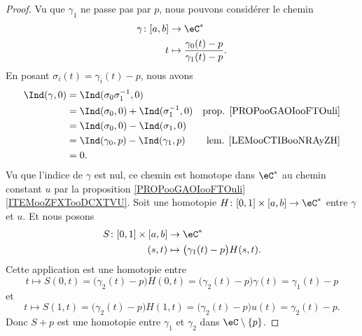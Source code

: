 \begin{proof}
	Vu que \( \gamma_1\) ne passe pas par \( p\), nous pouvons considérer le chemin
	\begin{equation}
		\begin{aligned}
			\gamma\colon \mathopen[ a , b \mathclose] & \to \eC^*                                        \\
			t                                         & \mapsto \frac{ \gamma_0(t)-p }{ \gamma_1(t)-p }.
		\end{aligned}
	\end{equation}
	En posant \( \sigma_i(t)=\gamma_i(t)-p\), nous avons
	\begin{subequations}
		\begin{align}
			\Ind(\gamma,0) & =\Ind(\sigma_0\sigma_1^{-1},0)                                                  \\
			               & =\Ind(\sigma_0,0)+\Ind(\sigma_1^{-1},0) & \text{prop. \ref{PROPooGAOIooFTOuli}} \\
			               & =\Ind(\sigma_0,0)-\Ind(\sigma_1,0)                                              \\
			               & =\Ind(\gamma_0,p)-\Ind(\gamma_1,p)      & \text{lem. \ref{LEMooCTIBooNRAyZH}}   \\
			               & =0.
		\end{align}
	\end{subequations}
	Vu que l'indice de \( \gamma\) est nul, ce chemin est homotope dans \( \eC^*\) au chemin constant \( u\) par la proposition \ref{PROPooGAOIooFTOuli}\ref{ITEMooZFXTooDCXTVU}. Soit une homotopie \( H\colon \mathopen[ 0 , 1 \mathclose]\times \mathopen[ a , b \mathclose]\to \eC^*\) entre \( \gamma\) et \( u\). Et nous posons
	\begin{equation}
		\begin{aligned}
			S\colon \mathopen[ 0 , 1 \mathclose]\times \mathopen[ a , b \mathclose] & \to \eC^*                                 \\
			(s,t)                                                                   & \mapsto \big( \gamma_1(t)-p \big)H(s,t) .
		\end{aligned}
	\end{equation}
	Cette application est une homotopie entre
	\begin{equation}
		t\mapsto S(0,t)=\big( \gamma_2(t)-p \big)H(0,t)=\big( \gamma_2(t)-p \big)\gamma(t)=\gamma_1(t)-p
	\end{equation}
	et
	\begin{equation}
		t\mapsto S(1,t)=\big( \gamma_2(t)-p \big)H(1,t)=\big( \gamma_2(t)-p \big)u(t)=\gamma_2(t)-p.
	\end{equation}
	Donc \( S+p\) est une homotopie entre \( \gamma_1\) et \( \gamma_2\) dans \( \eC\setminus\{ p \}\).
\end{proof}

